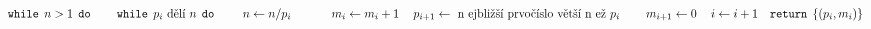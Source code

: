 \documentclass[preview]{standalone}
\begin{document}
\begin{align*}
&\mathtt{ while } \:\:  n  > 1 \:\: \mathtt{ do } &\hspace*{12pt}\mathtt{ while } \:\:  p_i  \text{ dělí }  n  \:\: \mathtt{ do } &\hspace*{24pt} n  \leftarrow  n  /  p_i &\hspace*{24pt} m_i  \leftarrow  m_i  + 1 &\hspace*{12pt}p_{i+1} \leftarrow \text{  n ejbližší prvočíslo větší  n ež }  p_i &\hspace*{12pt}m_{i+1} \leftarrow 0 &\hspace*{12pt}i \leftarrow i + 1 &\mathtt{ return } \:\: \{( p_i ,  m_i )\}
\end{align*}
\end{document}
